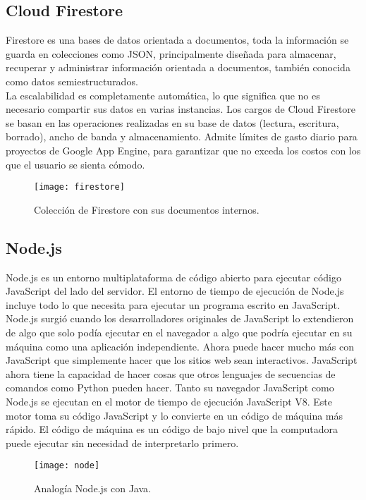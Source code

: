\subsection{Cloud Firestore}
Firestore es una bases de datos orientada a documentos, toda la información se guarda en colecciones como JSON, principalmente diseñada para almacenar, recuperar y administrar información orientada a documentos, también conocida como datos semiestructurados.\\[0.8cm]
La escalabilidad es completamente automática, lo que significa que no es necesario compartir sus datos en varias instancias. Los cargos de Cloud Firestore se basan en las operaciones realizadas en su base de datos (lectura, escritura, borrado), ancho de banda y almacenamiento. Admite límites de gasto diario para proyectos de Google App Engine, para garantizar que no exceda los costos con los que el usuario se sienta cómodo.
\begin{figure}[H]
  \centering
  \texttt{[image: firestore]}
  \caption{Colección de Firestore con sus documentos internos.}
\end{figure}
\subsection{Node.js}
Node.js es un entorno multiplataforma de código abierto para ejecutar código JavaScript del lado del servidor. El entorno de tiempo de ejecución de Node.js incluye todo lo que necesita para ejecutar un programa escrito en JavaScript. \\[0.8cm]
Node.js surgió cuando los desarrolladores originales de JavaScript lo extendieron de algo que solo podía ejecutar en el navegador a algo que podría ejecutar en su máquina como una aplicación independiente. Ahora puede hacer mucho más con JavaScript que simplemente hacer que los sitios web sean interactivos. JavaScript ahora tiene la capacidad de hacer cosas que otros lenguajes de secuencias de comandos como Python pueden hacer. Tanto su navegador JavaScript como Node.js se ejecutan en el motor de tiempo de ejecución JavaScript V8. Este motor toma su código JavaScript y lo convierte en un código de máquina más rápido. El código de máquina es un código de bajo nivel que la computadora puede ejecutar sin necesidad de interpretarlo primero.
\begin{figure}[H]
  \centering
  \texttt{[image: node]}
  \caption{Analogía Node.js con Java.}
\end{figure}
\vspace{0.8cm}
